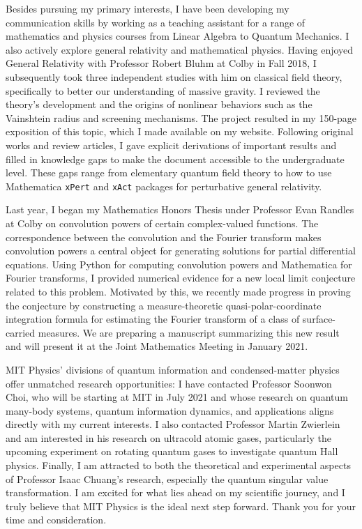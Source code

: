 \documentclass[12pt]{article}
\begin{document}
Besides pursuing my primary interests, I have been developing my communication skills by working as a teaching assistant for a range of mathematics and physics courses from Linear Algebra to Quantum Mechanics. I also actively explore general relativity and mathematical physics. Having enjoyed General Relativity with Professor Robert Bluhm at Colby in Fall 2018, I subsequently took three independent studies with him on classical field theory, specifically to better our understanding of massive gravity. I reviewed the theory's development and the origins of nonlinear behaviors such as the Vainshtein radius and screening mechanisms. The project resulted in my 150-page exposition of this topic, which I made available on my website. Following original works and review articles, I gave explicit derivations of important results and filled in knowledge gaps to make the document accessible to the undergraduate level. These gaps range from elementary quantum field theory to how to use Mathematica \texttt{xPert} and \texttt{xAct} packages for perturbative general relativity. \\ \vspace{-9pt}

Last year, I began my Mathematics Honors Thesis under Professor Evan Randles at Colby on convolution powers of certain complex-valued functions. The correspondence between the convolution and the Fourier transform makes convolution powers a central object for generating solutions for partial differential equations. Using Python for computing convolution powers and Mathematica for Fourier transforms, I provided numerical evidence for a new local limit conjecture related to this problem. Motivated by this, we recently made progress in proving the conjecture by constructing a measure-theoretic quasi-polar-coordinate integration formula for estimating the Fourier transform of a class of surface-carried measures. We are preparing a manuscript summarizing this new result and will present it at the Joint Mathematics Meeting in January 2021. \\ \vspace{-9pt}

MIT Physics' divisions of quantum information and condensed-matter physics offer unmatched research opportunities: I have contacted Professor Soonwon Choi, who will be starting at MIT in July 2021 and whose research on quantum many-body systems, quantum information dynamics, and applications aligns directly with my current interests. I also contacted Professor Martin Zwierlein and am interested in his research on ultracold atomic gases, particularly the upcoming experiment on rotating quantum gases to investigate quantum Hall physics. Finally, I am attracted to both the theoretical and experimental aspects of Professor Isaac Chuang's research, especially the quantum singular value transformation. I am excited for what lies ahead on my scientific journey, and I truly believe that MIT Physics is the ideal next step forward. Thank you for your time and consideration.\\  \vspace{-4pt}
\end{document}
